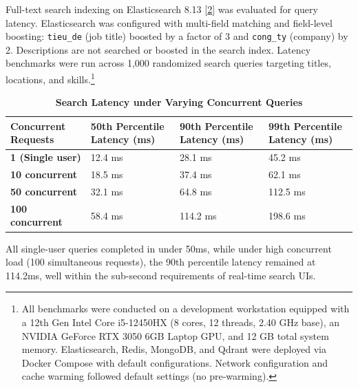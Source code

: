 \documentclass[12pt, a4paper]{report}
\begin{document}
\vspace{0.8cm}
\vspace{0.4cm}

Full-text search indexing on Elasticsearch 8.13 [\hyperlink{cite2}{2}] was evaluated for query latency. Elasticsearch was configured with multi-field matching and field-level boosting: \texttt{tieu\_de} (job title) boosted by a factor of 3 and \texttt{cong\_ty} (company) by 2. Descriptions are not searched or boosted in the search index. Latency benchmarks were run across 1,000 randomized search queries targeting titles, locations, and skills.\footnote{All benchmarks were conducted on a development workstation equipped with a 12th Gen Intel Core i5-12450HX (8 cores, 12 threads, 2.40 GHz base), an NVIDIA GeForce RTX 3050 6GB Laptop GPU, and 12 GB total system memory. Elasticsearch, Redis, MongoDB, and Qdrant were deployed via Docker Compose with default configurations. Network configuration and cache warming followed default settings (no pre-warming).}

\begin{table}[H]
    \centering
    \caption[Search Latency under Varying Concurrent Queries]{\textbf{Search Latency under Varying Concurrent Queries}}
    \vspace{0.2cm}
    \normalsize
    \renewcommand{\arraystretch}{1.3}
    \begin{tabularx}{\textwidth}{Z{1.0} | Z{1.0} | Z{1.0} | Z{1.0}}
    \hline\hline
    Concurrent Requests & 50th Percentile Latency (ms) & 90th Percentile Latency (ms) & 99th Percentile Latency (ms) \\
    \hline
    \textbf{1 (Single user)} & 12.4 ms & 28.1 ms & 45.2 ms \\
    \textbf{10 concurrent} & 18.5 ms & 37.4 ms & 62.1 ms \\
    \textbf{50 concurrent} & 32.1 ms & 64.8 ms & 112.5 ms \\
    \textbf{100 concurrent} & 58.4 ms & 114.2 ms & 198.6 ms \\
    \hline\hline
    \end{tabularx}
\end{table}

All single-user queries completed in under 50ms, while under high concurrent load (100 simultaneous requests), the 90th percentile latency remained at 114.2ms, well within the sub-second requirements of real-time search UIs.
\end{document}
